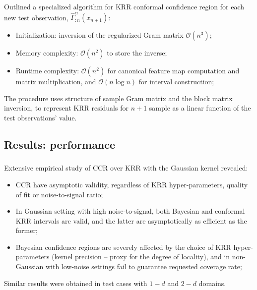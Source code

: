 \documentclass[t]{beamer}  %
\newcommand{\Ocal}{\mathcal{O}}
\begin{document}
\begin{frame}[c]\frametitle{\insertsection}
  \framesubtitle{\insertsubsection}
  Outlined a specialized algorithm for KRR conformal confidence region for each
  new test observation, $\hat{\Gamma}^\alpha_{:n}(x_{n+1})$:
  \begin{itemize}
    \item Initialization: inversion of the regularized Gram matrix $\Ocal(n^3)$;
    \item Memory complexity: $\mathcal{O}(n^2)$ to store the inverse;
    \item Runtime complexity: $\Ocal(n^2)$ for canonical feature map computation
    and matrix multiplication, and $\Ocal(n \log n)$ for interval construction;
  \end{itemize}

  The procedure uses structure of sample Gram matrix and the block matrix inversion,
  to represent KRR residuals for $n+1$ sample as a linear function of the test
  observations' value.
\end{frame}


\subsection{Results: performance} %
\label{sub:results_performance}

\begin{frame}[c]\frametitle{\insertsection}
  \framesubtitle{\insertsubsection}
  Extensive empirical study of CCR over KRR with the Gaussian kernel revealed:
  \begin{itemize}
    \item CCR have asymptotic validity, regardless of KRR hyper-parameters, quality
    of fit or noise-to-signal ratio;
    \item In Gaussian setting with high noise-to-signal, both Bayesian and conformal
    KRR intervals are valid, and the latter are asymptotically as efficient as the
    former;
    \item Bayesian confidence regions are severely affected by the choice of KRR
    hyper-parameters (kernel precision -- proxy for the degree of locality), and
    in non-Gaussian with low-noise settings fail to guarantee requested coverage
    rate;
  \end{itemize}
  Similar results were obtained in test cases with $1-d$ and $2-d$ domains.
\end{frame}
\end{document}
